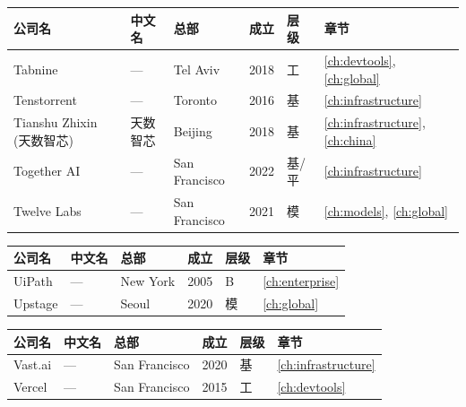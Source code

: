 \bigskip

\nopagebreak
\begin{tabularx}{\textwidth}{@{}l X l l l l@{}}
\toprule
\rowcolor{figLightGray}
\textbf{公司名} & \textbf{中文名} & \textbf{总部} & \textbf{成立} & \textbf{层级} & \textbf{章节} \\
\midrule
Tabnine             & ---             & Tel Aviv      & 2018 & 工   & \ref{ch:devtools}, \ref{ch:global} \\
Tenstorrent         & ---             & Toronto       & 2016 & 基   & \ref{ch:infrastructure} \\
Tianshu Zhixin (天数智芯) & 天数智芯  & Beijing       & 2018 & 基   & \ref{ch:infrastructure}, \ref{ch:china} \\
Together AI         & ---             & San Francisco & 2022 & 基/平 & \ref{ch:infrastructure} \\
Twelve Labs         & ---             & San Francisco & 2021 & 模   & \ref{ch:models}, \ref{ch:global} \\
\bottomrule
\end{tabularx}

\bigskip

\nopagebreak
\begin{tabularx}{\textwidth}{@{}l X l l l l@{}}
\toprule
\rowcolor{figLightGray}
\textbf{公司名} & \textbf{中文名} & \textbf{总部} & \textbf{成立} & \textbf{层级} & \textbf{章节} \\
\midrule
UiPath              & ---             & New York      & 2005 & B    & \ref{ch:enterprise} \\
Upstage             & ---             & Seoul         & 2020 & 模   & \ref{ch:global} \\
\bottomrule
\end{tabularx}

\bigskip

\nopagebreak
\begin{tabularx}{\textwidth}{@{}l X l l l l@{}}
\toprule
\rowcolor{figLightGray}
\textbf{公司名} & \textbf{中文名} & \textbf{总部} & \textbf{成立} & \textbf{层级} & \textbf{章节} \\
\midrule
Vast.ai             & ---             & San Francisco & 2020 & 基   & \ref{ch:infrastructure} \\
Vercel              & ---             & San Francisco & 2015 & 工   & \ref{ch:devtools} \\
\bottomrule
\end{tabularx}

